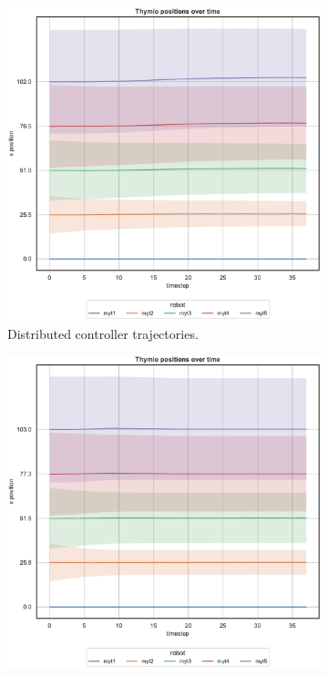 \begin{figure}[!htb]
\begin{center}
\begin{subfigure}[h]{0.49\textwidth}
			\includegraphics[width=.95\textwidth]{contents/images/net-d12/position-overtime-learned_distributed}
			\caption{Distributed controller trajectories.}
		\end{subfigure}
	\end{center}
	\begin{center}
		\begin{subfigure}[h]{0.49\textwidth}
			\centering			
			\includegraphics[width=.95\textwidth]{contents/images/net-d12/position-overtime-manual}%

\end{subfigure}
\end{center}
\end{figure}
